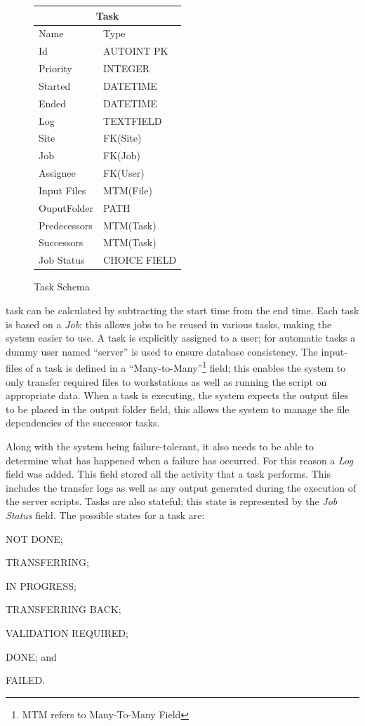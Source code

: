 \begin{figure}
\begin{tabular}{l|l}
    \multicolumn{2}{c}{Task} \\
    \hline
    Name        & Type \\
    \hline
    Id              & AUTOINT PK  \\
    Priority        & INTEGER  \\
    Started         & DATETIME \\
    Ended           & DATETIME \\
    Log             & TEXTFIELD \\
    Site            & FK(Site) \\
    Job             & FK(Job) \\
    Assignee        & FK(User) \\
    Input Files     & MTM(File) \\
    OuputFolder     & PATH \\
    Predecessors    & MTM(Task) \\
    Successors      & MTM(Task) \\
    Job Status      & CHOICE FIELD \\
\end{tabular}
\caption{Task Schema}
\end{figure}
\noindent task can be calculated by subtracting the start time from the end time. Each
task is based on a \emph{Job}: this allows jobs to be reused in various tasks, making the
system easier to use. A task is explicitly assigned to a user; for automatic tasks a
dummy user named ``server'' is used to ensure database consistency. The input-files of
a task is defined in a ``Many-to-Many''\footnote{MTM refers to Many-To-Many Field}
field; this enables the system to only transfer
required files to workstations as well as running the script on appropriate data. When
a task is executing, the system expects the output files to be placed in the output folder
field, this allows the system to manage the file dependencies of the successor tasks.

Along with the system being failure-tolerant, it also needs to be able to determine what
has happened when a failure has occurred. For this reason a \emph{Log} field was
added. This field stored all the activity that a task performs. This includes the transfer logs as
well as any output generated during the execution of the server scripts. Tasks are also
stateful; this state is represented by the \emph{Job Status} field. The possible states
for a task are:
\begin{inparaenum}[(i)]
\item NOT DONE;
\item TRANSFERRING;
\item IN PROGRESS;
\item TRANSFERRING BACK;
\item VALIDATION REQUIRED;
\item DONE; and
\item FAILED.
\end{inparaenum}

